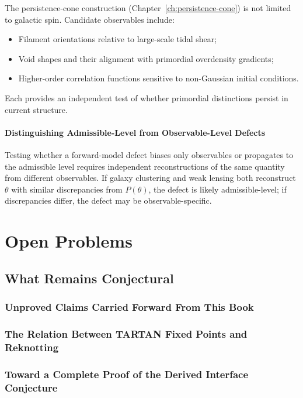 \documentclass[12pt,a4paper,twoside,openright]{book}
\theoremstyle{plain}
\theoremstyle{definition}
\theoremstyle{remark}
\begin{document}
The persistence-cone construction (Chapter~\ref{ch:persistence-cone}) is not limited to galactic spin. Candidate observables include:
\begin{itemize}
\item Filament orientations relative to large-scale tidal shear;
\item Void shapes and their alignment with primordial overdensity gradients;
\item Higher-order correlation functions sensitive to non-Gaussian initial conditions.
\end{itemize}

Each provides an independent test of whether primordial distinctions persist in current structure.

\subsection{Distinguishing Admissible-Level from Observable-Level Defects}

Testing whether a forward-model defect biases only observables or propagates to the admissible level requires independent reconstructions of the same quantity from different observables. If galaxy clustering and weak lensing both reconstruct $\theta$ with similar discrepancies from $P(\theta)$, the defect is likely admissible-level; if discrepancies differ, the defect may be observable-specific.


\part{Open Problems}

\chapter{What Remains Conjectural}
\label{ch:open-problems}

\section{Unproved Claims Carried Forward From This Book}

\section{The Relation Between TARTAN Fixed Points and Reknotting}

\section{Toward a Complete Proof of the Derived Interface Conjecture}
\end{document}
